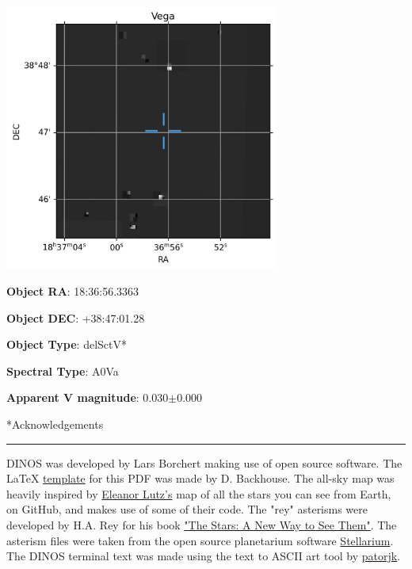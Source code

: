 \documentclass[12pt,preprintnumbers,amsmath,amssymb,nofootinbib,superscriptaddress]{revtex4-1}
\begin{document}
\begin{minipage}{0.6\textwidth}
    \includegraphics[width=9cm]{./example_output/finder_Vega.jpg}
\vspace{-2cm}

\end{minipage}
\begin{minipage}{0.3\textwidth}

\textbf{Object RA}: 18:36:56.3363

\textbf{Object DEC}: +38:47:01.28

\textbf{Object Type}: delSctV*

\textbf{Spectral Type}: A0Va

\textbf{Apparent V magnitude}: 0.030$\pm$0.000

\end{minipage}


\newpage

*{Acknowledgements}
\vspace{-0.2cm}\hrule
\vspace{1cm}

DINOS was developed by Lars Borchert making use of open source software.
The LaTeX \href{https://www.overleaf.com/latex/templates/academic-presentation-template/jpgfpsstrwzd}{template} for this PDF was made by D. Backhouse.
The all-sky map was heavily inspired by \href{https://github.com/eleanorlutz/western_constellations_atlas_of_space}{Eleanor Lutz's} map of all the stars you can see from Earth, on GitHub, and makes use of some of their code.
The "rey" asterisms were developed by H.A. Rey for his book \href{https://en.wikipedia.org/wiki/The_Stars:_A_New_Way_to_See_Them}{"The Stars: A New Way to See Them"}.
The asterism files were taken from the open source planetarium software \href{https://stellarium.org/}{Stellarium}.
The DINOS terminal text was made using the text to ASCII art tool by \href{http://patorjk.com/software/taag/#p=display&f=Bi}{patorjk}.
\end{document}

